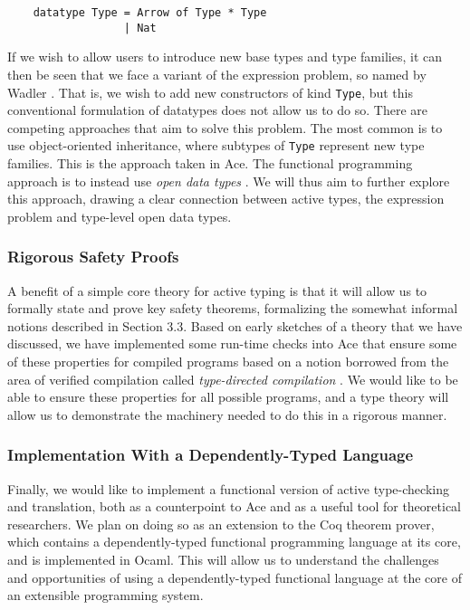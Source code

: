 \begin{verbatim}
    datatype Type = Arrow of Type * Type 
                  | Nat
\end{verbatim}

If we wish to allow users to introduce new base types and type families, it can then be seen that we face a variant of the expression problem, so named by Wadler \cite{wadler1998expression}. That is, we wish to add new constructors of kind \verb|Type|, but this conventional formulation of datatypes does not allow us to do so. There are competing approaches that aim to solve this problem. The most common is to use object-oriented inheritance, where subtypes of \verb|Type| represent new type families. This is the approach taken in Ace. The functional programming approach is to instead use \emph{open data types} \cite{conf/ppdp/LohH06}. We will thus aim to further explore this approach, drawing a clear connection between active types, the expression problem and type-level open data types.

\subsubsection{Rigorous Safety Proofs}
A benefit of a simple core theory for active typing is that it will allow us to formally state and prove key safety theorems, formalizing the somewhat informal notions described in Section 3.3. Based on early sketches of a theory that we have discussed, we have implemented some run-time checks into Ace that ensure some of these properties for compiled programs based on a notion borrowed from the area of verified compilation called \emph{type-directed compilation} \cite{tarditi+:til-OLD}. We would like to be able to ensure these properties for all possible programs, and a type theory will allow us to demonstrate the machinery needed to do this in a rigorous manner.

\subsubsection{Implementation With a Dependently-Typed Language}
Finally, we would like to implement a functional version of active type-checking and translation, both as a counterpoint to Ace and as a useful tool for theoretical researchers. We plan on doing so as an extension to the Coq theorem prover, which contains a dependently-typed functional programming language at its core, and is implemented in Ocaml. This will allow us to understand the challenges and opportunities of using a dependently-typed functional language at the core of an extensible programming system.
 
